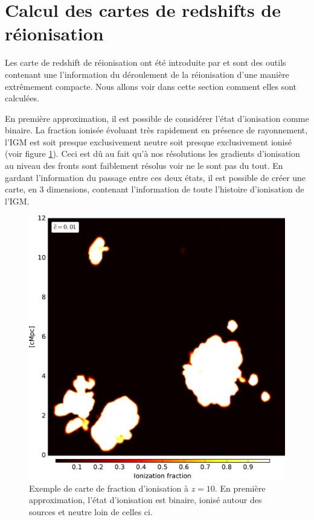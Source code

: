 

\section{Calcul des cartes de redshifts de réionisation}
\label{sec:zmapcompute}

Les carte de redshift de réionisation ont été introduite par \cite{2008ApJ...689L..81T} et sont des outils contenant une l'information du déroulement de la réionisation d'une manière extrêmement compacte.
Nous allons voir dans cette section comment elles sont calculées.

En première approximation, il est possible de considérer l'état d'ionisation comme binaire.
La fraction ionisée évoluant très rapidement en présence de rayonnement, l'\ac{IGM} est soit presque exclusivement neutre soit presque exclusivement ionisé (voir figure \ref{fig:xionmap}).
Ceci est dû au fait qu'à nos résolutions les gradients d'ionisation au niveau des fronts sont faiblement résolus voir ne le sont pas du tout.
En gardant l'information du passage entre ces deux états, il est possible de créer une carte, en 3 dimensions, contenant l’information de toute l'histoire d'ionisation de l'\ac{IGM}.


\begin{figure}
        \includegraphics[width=.95\linewidth]{img/04_mapreio/xion_map.pdf} 
        \caption[Carte de fraction d'ionisation]{Exemple de carte de fraction d'ionisation à $z=10$.
        En première approximation, l'état d'ionisation est binaire, ionisé autour des sources et neutre loin de celles ci.
 		\label{fig:xionmap}}
\end{figure}


